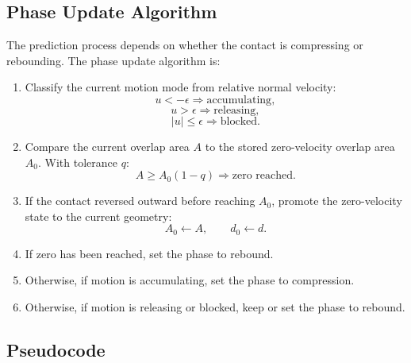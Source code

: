 \subsection{Phase Update Algorithm}

The prediction process depends on whether the contact is compressing or
rebounding. The phase update algorithm is:

\begin{enumerate}
    \item Classify the current motion mode from relative normal velocity:
    \[
        u < -\epsilon \Rightarrow \text{accumulating},
    \]
    \[
        u > \epsilon \Rightarrow \text{releasing},
    \]
    \[
        |u| \le \epsilon \Rightarrow \text{blocked}.
    \]

    \item Compare the current overlap area \(A\) to the stored zero-velocity
    overlap area \(A_0\). With tolerance \(q\):
    \[
        A \ge A_0(1-q)
        \Rightarrow
        \text{zero reached}.
    \]

    \item If the contact reversed outward before reaching \(A_0\), promote the
    zero-velocity state to the current geometry:
    \[
        A_0 \leftarrow A,
        \qquad
        d_0 \leftarrow d.
    \]

    \item If zero has been reached, set the phase to rebound.

    \item Otherwise, if motion is accumulating, set the phase to compression.

    \item Otherwise, if motion is releasing or blocked, keep or set the phase
    to rebound.
\end{enumerate}

\subsection{Pseudocode}

